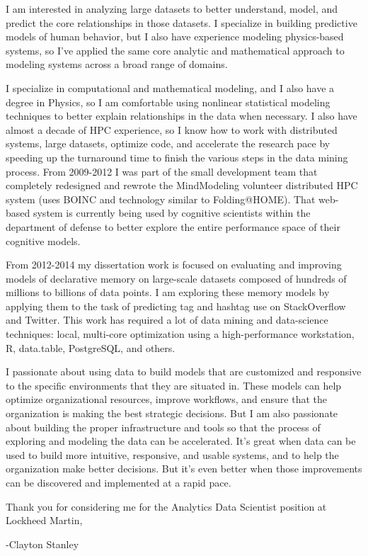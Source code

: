 \documentclass{article}
\begin{document}
I am interested in analyzing large datasets to better understand, model, and predict the core relationships in those datasets.
I specialize in building predictive models of human behavior, but I also have experience modeling physics-based systems,
so I've applied the same core analytic and mathematical approach to modeling systems across a broad range of domains.

I specialize in computational and mathematical modeling, and I also have a degree in Physics, so I am comfortable using nonlinear statistical modeling techniques to better explain relationships in the data when necessary.
I also have almost a decade of HPC experience, so I know how to work with distributed systems, large datasets, optimize code,
and accelerate the research pace by speeding up the turnaround time to finish the various steps in the data mining process. 
From 2009-2012 I was part of the small development team that completely redesigned and rewrote the MindModeling volunteer distributed HPC system (uses BOINC and technology similar to Folding@HOME).
That web-based system is currently being used by cognitive scientists within the department of defense to better explore the entire performance space of their cognitive models.

From 2012-2014 my dissertation work is focused on evaluating and improving models of declarative memory on large-scale datasets composed of hundreds of millions to billions of data points.
I am exploring these memory models by applying them to the task of predicting tag and hashtag use on StackOverflow and Twitter.
This work has required a lot of data mining and data-science techniques: local, multi-core optimization using a high-performance workstation, R, data.table, PostgreSQL, and others.

I passionate about using data to build models that are customized and responsive to the specific environments that they are situated in.
These models can help optimize organizational resources, improve workflows, and ensure that the organization is making the best strategic decisions.
But I am also passionate about building the proper infrastructure and tools so that the process of exploring and modeling the data can be accelerated.
It's great when data can be used to build more intuitive, responsive, and usable systems, and to help the organization make better decisions.
But it's even better when those improvements can be discovered and implemented at a rapid pace.

Thank you for considering me for the Analytics Data Scientist position at Lockheed Martin,

-Clayton Stanley
\end{document}
